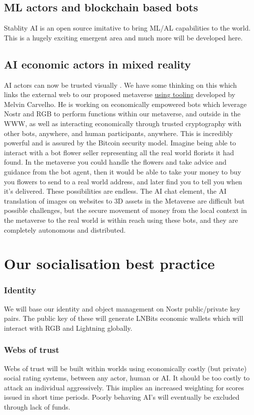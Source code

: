 \subsection{ML actors and blockchain based bots}
Stablity AI is an open source imitative to bring ML/AL capabilities to the world. This is a hugely exciting emergent area and much more will be developed here.
\subsection{AI economic actors in mixed reality}
AI actors can now be trusted visually \cite{nightingale2022ai}. We have some thinking on this which links the external web to our proposed metaverse \href{https://melbotz.github.io/melbot_20220713/}{using tooling} developed by Melvin Carvelho. He is working on economically empowered bots which leverage Nostr and RGB to perform functions within our metaverse, and outside in the WWW, as well as interacting economically through trusted cryptography with other bots, anywhere, and human participants, anywhere. This is incredibly powerful and is assured by the Bitcoin security model. Imagine being able to interact with a bot flower seller representing all the real world florists it had found. In the metaverse you could handle the flowers and take advice and guidance from the bot agent, then it would be able to take your money to buy you flowers to send to a real world address, and later find you to tell you when it's delivered. These possibilities are endless. The AI chat element, the AI translation of images on websites to 3D assets in the Metaverse are difficult but possible challenges, but the secure movement of money from the local context in the metaverse to the real world is within reach using these bots, and they are completely autonomous and distributed.
\section{Our socialisation best practice}
\subsubsection{Identity}
We will base our identity and object management on Nostr public/private key pairs. The public key of these will generate LNBits economic wallets which will interact with RGB and Lightning globally.
\subsubsection{Webs of trust}
Webs of trust will be built within worlds using economically costly (but private) social rating systems, between any actor, human or AI. It should be too costly to attack an individual aggressively. This implies an increased weighting for scores issued in short time periods. Poorly behaving AI's will eventually be excluded through lack of funds.
